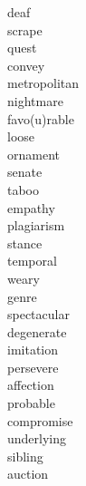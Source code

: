\documentclass[a4paper, 10pt]{ctexart}
\begin{document}
\begin{multicols*}{2}
\begin{description}
\item[deaf]

\item[scrape]

\item[quest]

\item[convey]

\item[metropolitan]

\item[nightmare]

\item[favo(u)rable]

\item[loose]

\item[ornament]

\item[senate]

\item[taboo]

\item[empathy]

\item[plagiarism]

\item[stance]

\item[temporal]

\item[weary]

\item[genre]

\item[spectacular]

\item[degenerate]

\item[imitation]

\item[persevere]

\item[affection]

\item[probable]

\item[compromise]

\item[underlying]

\item[sibling]

\item[auction]


\end{description}
\end{multicols*}
\end{document}
